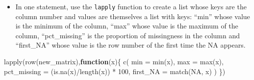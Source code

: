 \documentclass[
]{article}
\newenvironment{Shaded}{\begin{snugshade}}{\end{snugshade}}
\newcommand{\AttributeTok}[1]{\textcolor[rgb]{0.77,0.63,0.00}{#1}}
\newcommand{\ConstantTok}[1]{\textcolor[rgb]{0.00,0.00,0.00}{#1}}
\newcommand{\ControlFlowTok}[1]{\textcolor[rgb]{0.13,0.29,0.53}{\textbf{#1}}}
\newcommand{\DecValTok}[1]{\textcolor[rgb]{0.00,0.00,0.81}{#1}}
\newcommand{\FunctionTok}[1]{\textcolor[rgb]{0.00,0.00,0.00}{#1}}
\newcommand{\NormalTok}[1]{#1}
\newcommand{\SpecialCharTok}[1]{\textcolor[rgb]{0.00,0.00,0.00}{#1}}
\providecommand{\tightlist}{%
  \setlength{\itemsep}{0pt}\setlength{\parskip}{0pt}}
\begin{document}
\begin{itemize}
\tightlist
\item
  In one statement, use the \texttt{lapply} function to create a list
  whose keys are the column number and values are themselves a list with
  keys: ``min'' whose value is the minimum of the column, ``max'' whose
  value is the maximum of the column, ``pct\_missing'' is the proportion
  of missingness in the column and ``first\_NA'' whose value is the row
  number of the first time the NA appears.
\end{itemize}

\begin{Shaded}
\begin{Highlighting}[]
\FunctionTok{lapply}\NormalTok{(}\FunctionTok{row}\NormalTok{(new\_matrix),}\ControlFlowTok{function}\NormalTok{(x)\{}
  \FunctionTok{c}\NormalTok{(}
  \AttributeTok{min =} \FunctionTok{min}\NormalTok{(x),}
  \AttributeTok{max =} \FunctionTok{max}\NormalTok{(x),}
  \AttributeTok{pct\_missing =}\NormalTok{ (}\FunctionTok{is.na}\NormalTok{(x)}\SpecialCharTok{/}\FunctionTok{length}\NormalTok{(x)) }\SpecialCharTok{*} \DecValTok{100}\NormalTok{,}
  \AttributeTok{first\_NA =} \FunctionTok{match}\NormalTok{(}\ConstantTok{NA}\NormalTok{, x)}
\NormalTok{  )}
\NormalTok{\})}
\end{Highlighting}
\end{Shaded}
\end{document}

